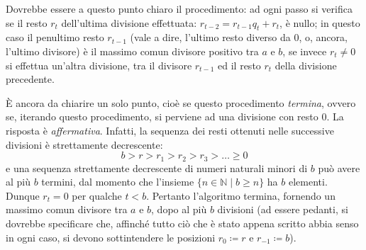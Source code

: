 Dovrebbe essere a questo punto chiaro il procedimento: ad ogni passo si verifica se il resto $r_{t}$ dell’ultima divisione effettuata: $r_{t-2} = r_{t-1} q_{t} + r_{t}$, è nullo; in questo caso il penultimo resto $r_{t-1}$ (vale a dire, l’ultimo resto diverso da 0, o, ancora, l’ultimo divisore) è il massimo comun divisore positivo tra $a$ e $b$, se invece $r_{t}\neq 0$ si effettua un’altra divisione, tra il divisore $r_{t-1}$ ed il resto $r_{t}$ della divisione precedente.

È ancora da chiarire un solo punto, cioè se questo procedimento \textit{termina}, ovvero se, iterando questo procedimento, si perviene ad una divisione con resto 0. La risposta è \textit{affermativa}. Infatti, la sequenza dei resti ottenuti nelle successive divisioni è strettamente decrescente:
\begin{displaymath}
	b > r > r_{1} > r_{2} > r_{3} > \ldots \geq 0
\end{displaymath}
e una sequenza strettamente decrescente di numeri naturali minori di $b$ può avere al più $b$ termini, dal momento che l’insieme $\{n \in \mathbb{N} \; | \; b \geq  n \}$ ha $b$ elementi. Dunque $r_{t} = 0$ per qualche $t < b$. Pertanto l’algoritmo termina, fornendo un massimo comun divisore tra $a$ e $b$, dopo al più $b$ divisioni (ad essere
pedanti, si dovrebbe specificare che, affinché tutto ciò che è stato appena scritto abbia senso in ogni caso, si devono sottintendere le posizioni $r_{0} \coloneqq r$ e $r_{-1} \coloneqq b$).


